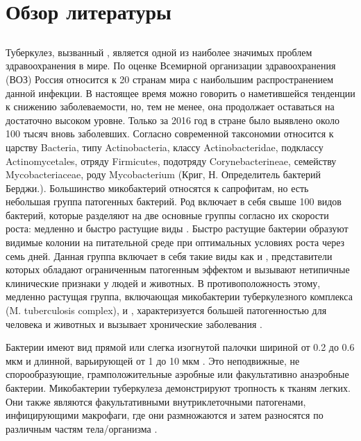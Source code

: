 \section{Обзор литературы}

\subsection{}
Туберкулез, вызванный , является одной из наиболее значимых проблем здравоохранения в мире. По оценке Всемирной организации здравоохранения (ВОЗ) Россия относится к 20 странам мира с наибольшим распространением данной инфекции. В настоящее время можно говорить о наметившейся тенденции к снижению заболеваемости, но, тем не менее, она продолжает оставаться на достаточно высоком уровне. Только за 2016 год в стране было выявлено около 100 тысяч вновь заболевших. Согласно современной таксономии  относится к царству Bacteria, типу Actinobacteria, классу Actinobacteridae, подклассу Actinomycetales, отряду Firmicutes, подотряду Corynebacterineae, семейству Mycobacteriaceae, роду Mycobacterium (Криг, Н. Определитель бактерий Берджи.). Большинство микобактерий относятся к сапрофитам, но есть небольшая группа патогенных бактерий. Род включает в себя свыше 100 видов бактерий, которые разделяют на две основные группы согласно их скорости роста: медленно и быстро растущие виды \cite{godreuil2007first}. Быстро растущие бактерии образуют видимые колонии на питательной среде при оптимальных условиях роста через семь дней. Данная группа включает в себя такие виды как  и , представители которых обладают ограниченным патогенным эффектом и вызывают нетипичные клинические признаки у людей и животных. В противоположность этому, медленно растущая группа, включающая микобактерии туберкулезного комплекса (M. tuberculosis complex),  и , характеризуется большей патогенностью для человека и животных и вызывает хронические заболевания \cite{godreuil2007first}.

Бактерии  имеют вид прямой или слегка изогнутой палочки шириной от 0.2 до 0.6 мкм и длинной, варьирующей от 1 до 10 мкм \cite{godreuil2007first}. Это неподвижные, не спорообразующие, грамположительные аэробные или факультативно анаэробные бактерии. Микобактерии туберкулеза демонстрируют тропность к тканям легких. Они также являются факультативными внутриклеточными патогенами, инфицирующими макрофаги, где они размножаются и затем разносятся по различным частям тела/организма \cite{van2001molecular}. 


